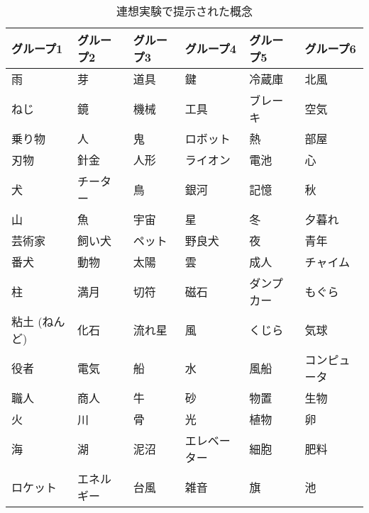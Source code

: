 \begin{table}[tb] 
\caption{連想実験で提示された概念}
\label{tbl:hyo1}
\begin{center}
\begin{small}
\begin{tabular}{|l|l|l|l|l|l|}\hline
グループ1  & グループ2  &  グループ3    &  グループ4  & グループ5 & グループ6   \\\hline\hline                 
雨             & 芽          & 道具   &鍵             & 冷蔵庫        & 北風            \\\hline 
ねじ           & 鏡          & 機械   &工具           & ブレーキ     &  空気          \\\hline   
乗り物         & 人          & 鬼     &ロボット       & 熱           &  部屋          \\\hline   
刃物           & 針金        & 人形   &ライオン       & 電池         &  心            \\\hline   
犬             & チーター    & 鳥     &銀河           & 記憶         &  秋            \\\hline   
山             & 魚          & 宇宙   &星             & 冬           &  夕暮れ        \\\hline   
芸術家         & 飼い犬      & ペット &野良犬         & 夜           &  青年          \\\hline   
番犬           & 動物        & 太陽   &雲             & 成人         &  チャイム      \\\hline   
柱             & 満月        & 切符   &磁石           & ダンプカー   &  もぐら        \\\hline   
粘土 (ねんど)  & 化石        & 流れ星 &風             & くじら       &  気球          \\\hline   
役者           & 電気        & 船     &水             & 風船         &  コンピュータ  \\\hline   
職人           & 商人        & 牛     &砂             & 物置         &  生物          \\\hline   
火             & 川          & 骨     &光             & 植物         &  卵            \\\hline   
海             & 湖          & 泥沼   &エレベーター   & 細胞         &  肥料          \\\hline   
ロケット       & エネルギー  & 台風   &雑音           & 旗           &  池            \\\hline   
\end{tabular}
\end{small}
\end{center}
\end{table}




